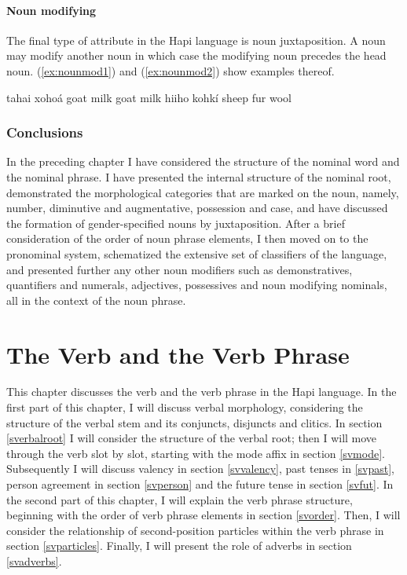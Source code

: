 \documentclass[a4paper, 12pt, oneside]{memoir}
\begin{document}
\subsubsection{Noun modifying}
The final type of attribute in the Hapi language is noun juxtaposition. A noun may modify another noun in which case the modifying noun precedes the head noun. (\ref{ex:nounmod1}) and (\ref{ex:nounmod2}) show examples thereof.
\begin{examples}
\ex \label{ex:nounmod1}
\bits tahai xohoá
\gloss goat milk
\tr goat milk
\ex \label{ex:nounmod2}
\bits hiiho kohkí
\gloss sheep fur
\tr wool
\end{examples}
\subsection{Conclusions}
In the preceding chapter I have considered the structure of the nominal word and the nominal phrase. I have presented the internal structure of the nominal root, demonstrated the morphological categories that are marked on the noun, namely, number, diminutive and augmentative, possession and case, and have discussed the formation of gender-specified nouns by juxtaposition. After a brief consideration of the order of noun phrase elements, I then moved on to the pronominal system, schematized the extensive set of classifiers of the language, and presented further any other noun modifiers such as demonstratives, quantifiers and numerals, adjectives, possessives and noun modifying nominals, all in the context of the noun phrase.
\chapter{The Verb and the Verb Phrase}
This chapter discusses the verb and the verb phrase in the Hapi language. In the first part of this chapter, I will discuss verbal morphology, considering the structure of the verbal stem and its conjuncts, disjuncts and clitics. In section \ref{sverbalroot} I will consider the structure of the verbal root; then I will move through the verb slot by slot, starting with the mode affix in section \ref{svmode}. Subsequently I will discuss valency in section \ref{svvalency}, past tenses in \ref{svpast}, person agreement in section \ref{svperson} and the future tense in section \ref{svfut}. In the second part of this chapter, I will explain the verb phrase structure, beginning with the order of verb phrase elements in section \ref{svorder}. Then, I will consider the relationship of second-position particles within the verb phrase in section \ref{svparticles}. Finally, I will present the role of adverbs in section \ref{svadverbs}.
\end{document}
